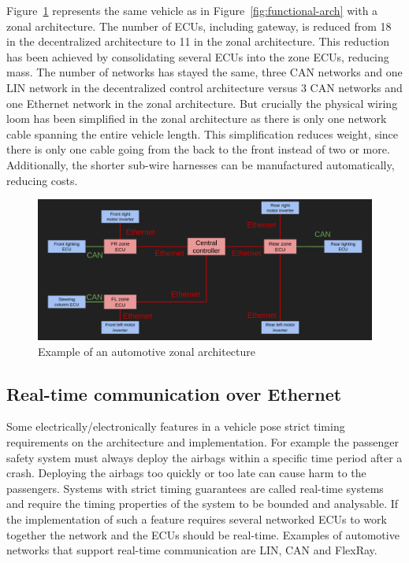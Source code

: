 Figure~\ref{fig:zonal-arch} represents the same vehicle as in Figure~\ref{fig:functional-arch} with a zonal architecture. The number of ECUs, including gateway, is reduced from 18 in the decentralized architecture to 11 in the zonal architecture. This reduction has been achieved by consolidating several ECUs into the zone ECUs, reducing mass. The number of networks has stayed the same, three CAN networks and one LIN network in the decentralized control architecture versus 3 CAN networks and one Ethernet network in the zonal architecture. But crucially the physical wiring loom has been simplified in the zonal architecture as there is only one network cable spanning the entire vehicle length. This simplification reduces weight, since there is only one cable going from the back to the front instead of two or more. Additionally, the shorter sub-wire harnesses can be manufactured automatically, reducing costs.

\begin{figure}[htb]
    \centering
    \includegraphics[width=\textwidth]{images/zone-arch.png}
    \caption{Example of an automotive zonal architecture}
    \label{fig:zonal-arch}
\end{figure}

\subsection{Real-time communication over Ethernet}
Some electrically/electronically features in a vehicle pose strict timing requirements on the architecture and implementation. For example the passenger safety system must always deploy the airbags within a specific time period after a crash. Deploying the airbags too quickly or too late can cause harm to the passengers. Systems with strict timing guarantees are called real-time systems and require the timing properties of the system to be bounded and analysable. If the implementation of such a feature requires several networked ECUs to work together the network and the ECUs should be real-time. Examples of automotive networks that support real-time communication are LIN, CAN and FlexRay. 


